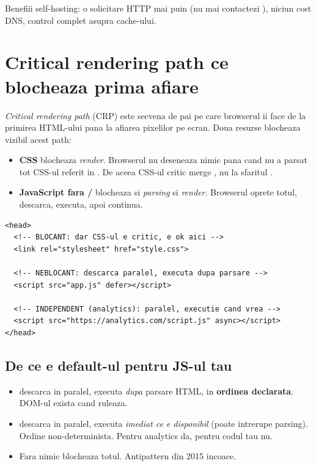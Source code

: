 Benefiii self-hosting: o solicitare HTTP mai puin (nu mai contactezi ), niciun cost DNS, control complet asupra cache-ului.

\section{Critical rendering path \textendash{} ce blocheaza prima afiare}

\emph{Critical rendering path} (CRP) este secvena de pai pe care browserul ii face de la primirea HTML-ului pana la afiarea pixelilor pe ecran. Doua resurse blocheaza vizibil acest path:

\begin{itemize}[itemsep=1pt]
  \item \textbf{CSS} \textendash{} blocheaza \emph{render}. Browserul nu deseneaza nimic pana cand nu a parsat tot CSS-ul referit in . De aceea CSS-ul critic merge , nu la sfaritul .
  \item \textbf{JavaScript fara /} \textendash{} blocheaza si \emph{parsing} si \emph{render}. Browserul oprete totul, descarca, executa, apoi continua.
\end{itemize}

\begin{lstlisting}[style=html, caption={Tipare}]
<head>
  <!-- BLOCANT: dar CSS-ul e critic, e ok aici -->
  <link rel="stylesheet" href="style.css">

  <!-- NEBLOCANT: descarca paralel, executa dupa parsare -->
  <script src="app.js" defer></script>

  <!-- INDEPENDENT (analytics): paralel, executie cand vrea -->
  <script src="https://analytics.com/script.js" async></script>
</head>
\end{lstlisting}

\subsection{De ce  e default-ul pentru JS-ul tau}

\begin{itemize}[itemsep=1pt]
  \item {} \textendash{} descarca in paralel, executa \emph{dupa} parsare HTML, in \textbf{ordinea declarata}. DOM-ul exista cand ruleaza.
  \item {} \textendash{} descarca in paralel, executa \emph{imediat ce e disponibil} (poate intrerupe parsing). Ordine non-determinista. Pentru analytics da, pentru codul tau nu.
  \item Fara nimic \textendash{} blochea\-za totul. Antipattern din 2015 incoace.
\end{itemize}

